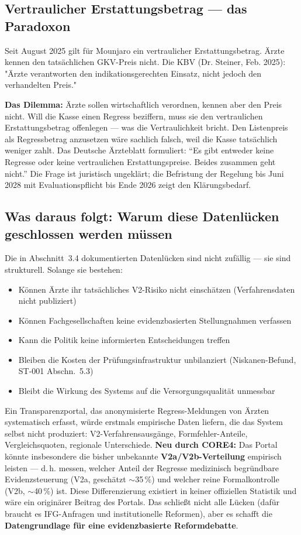 \documentclass{umbruch-position}
\begin{document}
\subsection{Vertraulicher Erstattungsbetrag — das Paradoxon}

Seit August 2025 gilt für Mounjaro ein vertraulicher Erstattungsbetrag. Ärzte kennen den tatsächlichen GKV-Preis nicht. Die KBV (Dr. Steiner, Feb. 2025): "Ärzte verantworten den indikationsgerechten Einsatz, nicht jedoch den verhandelten Preis."

\textbf{Das Dilemma:} Ärzte sollen wirtschaftlich verordnen, kennen aber den Preis nicht. Will die Kasse einen Regress beziffern, muss sie den vertraulichen Erstattungsbetrag offenlegen --- was die Vertraulichkeit bricht. Den Listenpreis als Regressbetrag anzusetzen wäre sachlich falsch, weil die Kasse tatsächlich weniger zahlt. Das Deutsche Ärzteblatt formuliert: ``Es gibt entweder keine Regresse oder keine vertraulichen Erstattungspreise. Beides zusammen geht nicht.'' Die Frage ist juristisch ungeklärt; die Befristung der Regelung bis Juni 2028 mit Evaluationspflicht bis Ende 2026 zeigt den Klärungsbedarf.

\subsection{Was daraus folgt: Warum diese Datenlücken geschlossen werden müssen}

Die in Abschnitt~3.4 dokumentierten Datenlücken sind nicht zufällig --- sie sind strukturell. Solange sie bestehen:
\begin{itemize}[nosep]
  \item Können Ärzte ihr tatsächliches V2-Risiko nicht einschätzen (Verfahrensdaten nicht publiziert)
  \item Können Fachgesellschaften keine evidenzbasierten Stellungnahmen verfassen
  \item Kann die Politik keine informierten Entscheidungen treffen
  \item Bleiben die Kosten der Prüfungsinfrastruktur unbilanziert (Niskanen-Befund, ST-001 Abschn.~5.3)
  \item Bleibt die Wirkung des Systems auf die Versorgungsqualität unmessbar
\end{itemize}

Ein Transparenzportal, das anonymisierte Regress-Meldungen von Ärzten systematisch erfasst, würde erstmals empirische Daten liefern, die das System selbst nicht produziert: V2-Verfahrensausgänge, Formfehler-Anteile, Vergleichsquoten, regionale Unterschiede. \textbf{Neu durch CORE4:} Das Portal könnte insbesondere die bisher unbekannte \textbf{V2a/V2b-Verteilung} empirisch leisten --- d.\,h. messen, welcher Anteil der Regresse medizinisch begründbare Evidenzsteuerung (V2a, geschätzt ${\sim}$35\,\%) und welcher reine Formalkontrolle (V2b, ${\sim}$40\,\%) ist. Diese Differenzierung existiert in keiner offiziellen Statistik und wäre ein originärer Beitrag des Portals. Das schließt nicht alle Lücken (dafür braucht es IFG-Anfragen und institutionelle Reformen), aber es schafft die \textbf{Datengrundlage für eine evidenzbasierte Reformdebatte}.
\end{document}
